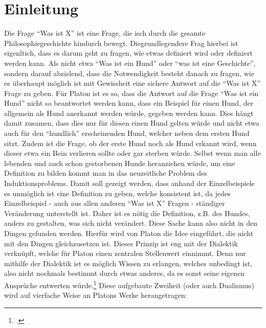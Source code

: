 \section{Einleitung}

Die Frage \enquote{Was ist X} ist eine Frage, die isch durch die gesamte Philosophiegeschichte hindurch bewegt. Diegrundlegendere Frag hierbei ist eigenltich, dass es darum geht zu fragen, wie etwas definiert wird oder definiert werden kann. Als nicht etwa \enquote{Was ist ein Hund} oder \enquote{was ist eine Geschichte}, sondern darauf abzielend, dass die Notwendigkeit besteht danach zu fragen, wie es überhaupt möglich ist mit Gewissheit eine sichere Antwort auf die \enquote{Was ist X} Frage zu geben. Für Platon ist es so, dass die Antwort auf die Frage \enquote{Was ist ein Hund} nicht so beantwortet werden kann, dass ein Beispiel für einen Hund, der allgemein als Hund anerkannt werden würde, gegeben werden kann. Dies hängt damit zusamen, dass dies nur für diesen einen Hund gelten würde und nicht etwa auch für den \enquote{hundlich} erscheinenden Hund, welcher neben dem ersten Hund sitzt. Zudem ist die Frage, ob der erste Hund noch als Hund erkannt wird, wenn dieser etwa ein Bein verlieren sollte oder gar sterben würde. Selbst wenn man alle lebenden und auch schon gestorbenen Hunde heranziehen würde, um eine Definition zu bilden kommt man in das neuzeitliche Problem des Induktionsproblems. Damit soll gezeigt werden, dass anhand der Einzelbeispiele es unmöglich ist eine Definition zu geben, welche konsistent ist, da jedes Einzelbeispiel - auch aus allen anderen \enquote{Was ist X} Fragen - ständiger Veränderung unterstellt ist. Daher ist es nötig die Definition, z.B. des Hundes, anders zu gestalten, was sich nicht verändert. Diese Sache kann also nicht in den Dingen gefunden werden. Hierfür wird von Platon die Idee eingeführt, die nicht mit den Dingen gleichzusetzen ist. 
Dieses Prinzip ist eng mit der Dialektik verknüpft, welche für Platon einen zentralen Stellenwert einnimmt. Denn nur mithilfe der Dialektik ist es möglich Wissen zu erlangen, welches unbedingt ist, also nicht nochmals bestimmt durch etwas anderes, da es sonst seine eigenen Ansprüche entwerten würde.\footcite[vgl.][S.83]{Staudacher}
Diese aufgebaute Zweiheit (oder auch Dualismus) wird auf vierfache Weise an Platons Werke herangetragen:
